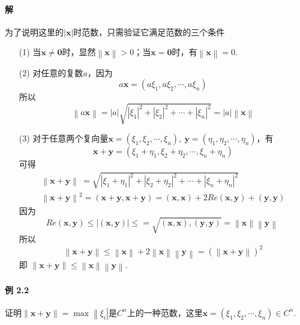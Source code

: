 \documentclass[12pt, a4paper, oneside, fontset=none]{ctexart}
\begin{document}
\paragraph*{解} 为了说明这里的$\left\lvert \bm{x} \right\rvert$时范数，只需验证它满足范数的三个条件
\begin{enumerate}
    \item[(1)]
        当$\bm{x} \neq \bm{0}$时，显然$\left\lVert \bm{x} \right\rVert > 0$；当$\bm{x} = \bm{0}$时，有$\left\lVert \bm{x} \right\rVert = 0$.
    \item[(2)] 对任意的复数$a$，因为
        \[
            a\bm{x} = (a\xi_1, a\xi_2, \cdots, a\xi_n)
        \]
        所以
        \[
            \left\lVert a\bm{x} \right\rVert = \left\lvert a \right\rvert \sqrt{\left\lvert \xi_1 \right\rvert^2 + \left\lvert \xi_2 \right\rvert^2 + \cdots +\left\lvert \xi_n \right\rvert^2} =
            \left\lvert a\right\rvert \left\lVert \bm{x} \right\rVert
        \]
    \item[(3)] 对于任意两个复向量$\bm{x} = (\xi_1,\xi_2,\cdots,\xi_n),\ \bm{y} = (\eta_1, \eta_2, \cdots, \eta_n)$，有
        \[
            \bm{x} + \bm{y} = (\xi_1 + \eta_1, \xi_2 + \eta_2,\cdots,\xi_n+\eta_n)
        \]
        可得
        \begin{gather*}
            \left\lVert \bm{x} + \bm{y} \right\rVert\ = \sqrt{\left\lvert \xi_1 + \eta_1 \right\rvert^2 + \left\lvert \xi_2 + \eta_2 \right\rvert^2 + \cdots +\left\lvert \xi_n + \eta_n \right\rvert^2} \\
            \left\lVert \bm{x} + \bm{y} \right\rVert^2 = (\bm{x} + \bm{y}, \bm{x} + \bm{y}) = (\bm{x}, \bm{x}) + 2Re(\bm{x},\bm{y}) + (\bm{y}, \bm{y})
        \end{gather*}
        因为
        \[
            Re(\bm{x}, \bm{y}) \leqslant \left\lvert (\bm{x}, \bm{y}) \right\rvert \leqslant = \sqrt{(\bm{x},\bm{x}), (\bm{y}, \bm{y})} = \left\lVert \bm{x} \right\rVert \left\lVert \bm{y} \right\rVert\
        \]
        所以
        \[
            \left\lVert \bm{x} + \bm{y} \right\rVert \leqslant \left\lVert \bm{x} \right\rVert + 2\left\lVert \bm{x}\right\rVert\left\lVert \bm{y} \right\rVert = (\left\lVert \bm{x} + \bm{y} \right\rVert)^2
        \]
        即 $\left\lVert \bm{x} + \bm{y} \right\rVert\leqslant \left\lVert \bm{x}\right\rVert\left\lVert \bm{y} \right\rVert$.
\end{enumerate}

\paragraph*{例 2.2} 证明$\left\lVert \bm{x} + \bm{y} \right\rVert = \max\left\lVert \xi_i \right\rvert$是$C^n$上的一种范数，这里$\bm{x} = (\xi_1,\xi_2,\cdots,\xi_n) \in C^n$.
\end{document}
